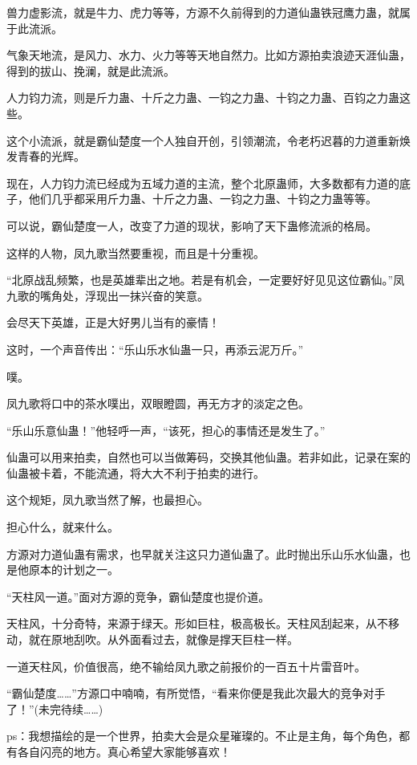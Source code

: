 \begin{this_body}
兽力虚影流，就是牛力、虎力等等，方源不久前得到的力道仙蛊铁冠鹰力蛊，就属于此流派。

气象天地流，是风力、水力、火力等等天地自然力。比如方源拍卖浪迹天涯仙蛊，得到的拔山、挽澜，就是此流派。

人力钧力流，则是斤力蛊、十斤之力蛊、一钧之力蛊、十钧之力蛊、百钧之力蛊这些。

这个小流派，就是霸仙楚度一个人独自开创，引领潮流，令老朽迟暮的力道重新焕发青春的光辉。

现在，人力钧力流已经成为五域力道的主流，整个北原蛊师，大多数都有力道的底子，他们几乎都采用斤力蛊、十斤之力蛊、一钧之力蛊、十钧之力蛊等等。

可以说，霸仙楚度一人，改变了力道的现状，影响了天下蛊修流派的格局。

这样的人物，凤九歌当然要重视，而且是十分重视。

“北原战乱频繁，也是英雄辈出之地。若是有机会，一定要好好见见这位霸仙。”凤九歌的嘴角处，浮现出一抹兴奋的笑意。

会尽天下英雄，正是大好男儿当有的豪情！

这时，一个声音传出：“乐山乐水仙蛊一只，再添云泥万斤。”

噗。

凤九歌将口中的茶水噗出，双眼瞪圆，再无方才的淡定之色。

“乐山乐意仙蛊！”他轻呼一声，“该死，担心的事情还是发生了。”

仙蛊可以用来拍卖，自然也可以当做筹码，交换其他仙蛊。若非如此，记录在案的仙蛊被卡着，不能流通，将大大不利于拍卖的进行。

这个规矩，凤九歌当然了解，也最担心。

担心什么，就来什么。

方源对力道仙蛊有需求，也早就关注这只力道仙蛊了。此时抛出乐山乐水仙蛊，也是他原本的计划之一。

“天柱风一道。”面对方源的竞争，霸仙楚度也提价道。

天柱风，十分奇特，来源于绿天。形如巨柱，极高极长。天柱风刮起来，从不移动，就在原地刮吹。从外面看过去，就像是撑天巨柱一样。

一道天柱风，价值很高，绝不输给凤九歌之前报价的一百五十片雷音叶。

“霸仙楚度……”方源口中喃喃，有所觉悟，“看来你便是我此次最大的竞争对手了！”(未完待续……)

ps：我想描绘的是一个世界，拍卖大会是众星璀璨的。不止是主角，每个角色，都有各自闪亮的地方。真心希望大家能够喜欢！

\end{this_body}

